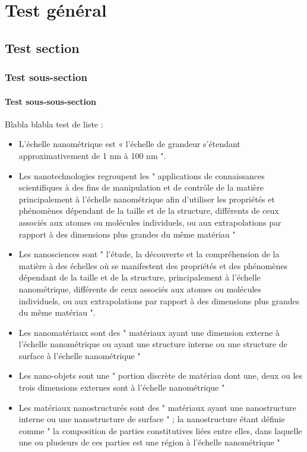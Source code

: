 \chapter{Test général} 


\section{Test section}
	\subsection{Test sous-section}
		\subsubsection{Test sous-sous-section}   
Blabla blabla test de liste : 
\begin{itemize}
	\item L'échelle nanométrique est « l'échelle de grandeur s'étendant approximativement de 1 nm à 100 nm ".  
    \item Les nanotechnologies  regroupent les " applications de connaissances scientifiques à des fins de manipulation et de contrôle de la matière principalement à l'échelle nanométrique afin d'utiliser les propriétés et phénomènes dépendant de la taille et de la structure, différents de ceux associés aux atomes ou molécules individuels, ou aux extrapolations par rapport à des dimensions plus grandes du même matériau " 
    \item Les nanosciences sont " l'étude, la découverte et la compréhension de la matière à des échelles où se manifestent des propriétés et des phénomènes dépendant de la taille et de la structure, principalement à l'échelle nanométrique, différents de ceux associés aux atomes ou molécules individuels, ou aux extrapolations par rapport à des dimensions plus grandes du même matériau ". 
    \item Les nanomatériaux sont des " matériaux ayant une dimension externe à l'échelle nanométrique ou ayant une structure interne ou une structure de surface à l'échelle nanométrique " 
    \item Les nano-objets sont une " portion discrète de matériau dont une, deux ou les trois dimensions externes sont à l'échelle nanométrique "  
    \item Les matériaux nanostructurés sont des " matériaux ayant une nanostructure interne ou une nanostructure de surface " ; la nanostructure étant définie comme " la composition de parties constitutives liées entre elles, dans laquelle une ou plusieurs de ces parties est une région à l'échelle nanométrique " 
\end{itemize}
    
